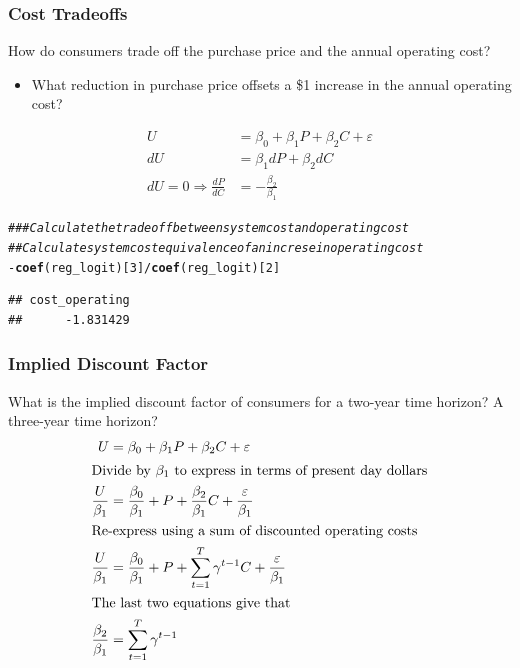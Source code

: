 \documentclass{beamer}\usepackage[]{graphicx}\usepackage[]{color}
\makeatletter
\newcommand{\hlnum}[1]{\textcolor[rgb]{0.686,0.059,0.569}{#1}}%
\newcommand{\hlcom}[1]{\textcolor[rgb]{0.678,0.584,0.686}{\textit{#1}}}%
\newcommand{\hlopt}[1]{\textcolor[rgb]{0,0,0}{#1}}%
\newcommand{\hlstd}[1]{\textcolor[rgb]{0.345,0.345,0.345}{#1}}%
\newcommand{\hlkwd}[1]{\textcolor[rgb]{0.737,0.353,0.396}{\textbf{#1}}}%
\newenvironment{kframe}{%
 \def\at@end@of@kframe{}%
 \ifinner\ifhmode%
  \def\at@end@of@kframe{\end{minipage}}%
  \begin{minipage}{\columnwidth}%
 \fi\fi%
 \def\FrameCommand##1{\hskip\@totalleftmargin \hskip-\fboxsep
 \colorbox{shadecolor}{##1}\hskip-\fboxsep
     \hskip-\linewidth \hskip-\@totalleftmargin \hskip\columnwidth}%
 \MakeFramed {\advance\hsize-\width
   \@totalleftmargin\z@ \linewidth\hsize
   \@setminipage}}%
 {\par\unskip\endMakeFramed%
 \at@end@of@kframe}
\newenvironment{knitrout}{}{} %
\makeatother
\begin{document}
\begin{frame}[fragile]\frametitle{Cost Tradeoffs}
    How do consumers trade off the purchase price and the annual operating cost?
    \begin{itemize}
        \item What reduction in purchase price offsets a \$1 increase in the annual operating cost?
    \end{itemize}
    \begin{align*}
        U &= \beta_0 + \beta_1 P + \beta_2 C + \varepsilon \\
        dU &= \beta_1 dP + \beta_2 dC \\
        dU = 0 \Rightarrow \frac{dP}{dC} &= -\frac{\beta_2}{\beta_1}
    \end{align*}
\begin{knitrout}\footnotesize
{}\color{fgcolor}\begin{kframe}
\begin{alltt}
\hlcom{### Calculate the tradeoff between system cost and operating cost}
\hlcom{## Calculate system cost equivalence of an increse in operating cost}
\hlopt{-}\hlkwd{coef}\hlstd{(reg_logit)[}\hlnum{3}\hlstd{]} \hlopt{/} \hlkwd{coef}\hlstd{(reg_logit)[}\hlnum{2}\hlstd{]}
\end{alltt}
\begin{verbatim}
## cost_operating 
##      -1.831429
\end{verbatim}
\end{kframe}
\end{knitrout}
\end{frame}

\begin{frame}\frametitle{Implied Discount Factor}
    What is the implied discount factor of consumers for a two-year time horizon? A three-year time horizon?
    \begin{align*}
        U &= \beta_0 + \beta_1 P + \beta_2 C + \varepsilon \\
        \intertext{Divide by $\beta_1$ to express in terms of present day dollars}
        \frac{U}{\beta_1} &= \frac{\beta_0}{\beta_1} + P + \frac{\beta_2}{\beta_1} C + \frac{\varepsilon}{\beta_1} \\
        \intertext{Re-express using a sum of discounted operating costs}
        \frac{U}{\beta_1} &= \frac{\beta_0}{\beta_1} + P + \sum_{t = 1}^T \gamma^{t - 1} C + \frac{\varepsilon}{\beta_1} \\
        \intertext{The last two equations give that}
        \frac{\beta_2}{\beta_1} &= \sum_{t = 1}^T \gamma^{t - 1}
    \end{align*}
\end{frame}
\end{document}
